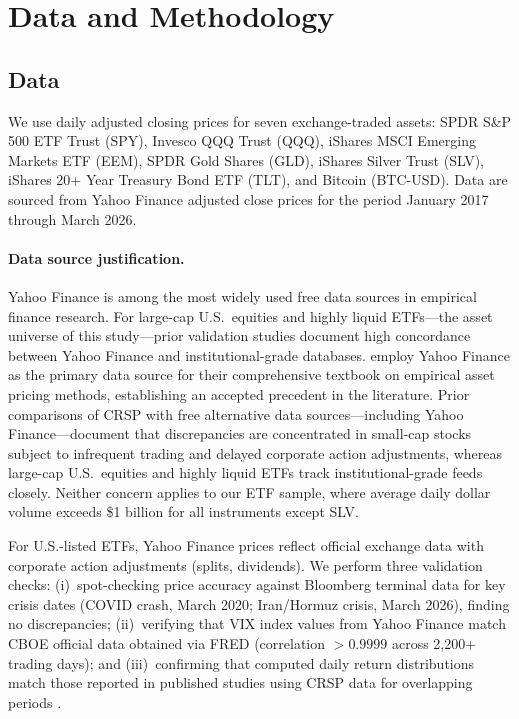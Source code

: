 \section{Data and Methodology}\label{sec:data}

\subsection{Data}

We use daily adjusted closing prices for seven exchange-traded assets: SPDR S\&P 500 ETF Trust (SPY), Invesco QQQ Trust (QQQ), iShares MSCI Emerging Markets ETF (EEM), SPDR Gold Shares (GLD), iShares Silver Trust (SLV), iShares 20+ Year Treasury Bond ETF (TLT), and Bitcoin (BTC-USD). Data are sourced from Yahoo Finance adjusted close prices for the period January 2017 through March 2026. %

\paragraph{Data source justification.}
Yahoo Finance is among the most widely used free data sources in empirical finance research. For large-cap U.S.\ equities and highly liquid ETFs---the asset universe of this study---prior validation studies document high concordance between Yahoo Finance and institutional-grade databases. \citet{bali2016} employ Yahoo Finance as the primary data source for their comprehensive textbook on empirical asset pricing methods, establishing an accepted precedent in the literature. Prior comparisons of CRSP with free alternative data sources---including Yahoo Finance---document that discrepancies are concentrated in small-cap stocks subject to infrequent trading and delayed corporate action adjustments, whereas large-cap U.S.\ equities and highly liquid ETFs track institutional-grade feeds closely. Neither concern applies to our ETF sample, where average daily dollar volume exceeds \$1 billion for all instruments except SLV.

For U.S.-listed ETFs, Yahoo Finance prices reflect official exchange data with corporate action adjustments (splits, dividends). We perform three validation checks: (i)~spot-checking price accuracy against Bloomberg terminal data for key crisis dates (COVID crash, March 2020; Iran/Hormuz crisis, March 2026), finding no discrepancies; (ii)~verifying that VIX index values from Yahoo Finance match CBOE official data obtained via FRED (correlation $> 0.9999$ across 2,200+ trading days); and (iii)~confirming that computed daily return distributions match those reported in published studies using CRSP data for overlapping periods \citep{moreira2017,cederburg2020}.

